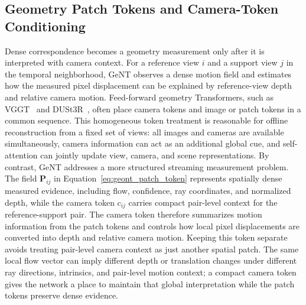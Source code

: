 \subsection{Geometry Patch Tokens and Camera-Token Conditioning}
Dense correspondence becomes a geometry measurement only after it is interpreted with camera context.
For a reference view $i$ and a support view $j$ in the temporal neighborhood, GeNT observes a dense motion field and estimates how the measured pixel displacement can be explained by reference-view depth and relative camera motion.
Feed-forward geometry Transformers, such as VGGT~\cite{wang2025vggt} and DUSt3R~\cite{wang2024dust3r}, often place camera tokens and image or patch tokens in a common sequence.
This homogeneous token treatment is reasonable for offline reconstruction from a fixed set of views: all images and cameras are available simultaneously, camera information can act as an additional global cue, and self-attention can jointly update view, camera, and scene representations.
By contrast, GeNT addresses a more structured streaming measurement problem.
The field $\bm{P}_{ij}$ in Equation~\ref{eq:geont_patch_token} represents spatially dense measured evidence, including flow, confidence, ray coordinates, and normalized depth, while the camera token $c_{ij}$ carries compact pair-level context for the reference-support pair.
The camera token therefore summarizes motion information from the patch tokens and controls how local pixel displacements are converted into depth and relative camera motion.
Keeping this token separate avoids treating pair-level camera context as just another spatial patch.
The same local flow vector can imply different depth or translation changes under different ray directions, intrinsics, and pair-level motion context; a compact camera token gives the network a place to maintain that global interpretation while the patch tokens preserve dense evidence.

